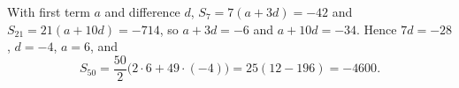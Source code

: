 With first term $a$ and difference $d$, $S_7=7(a+3d)=-42$ and $S_{21}=21(a+10d)=-714$, so $a+3d=-6$ and $a+10d=-34$. Hence $7d=-28$, $d=-4$, $a=6$, and
\[
S_{50}=\dfrac{50}{2}\bigl(2\cdot6+49\cdot(-4)\bigr)=25(12-196)=\boxed{-4600}.
\]
